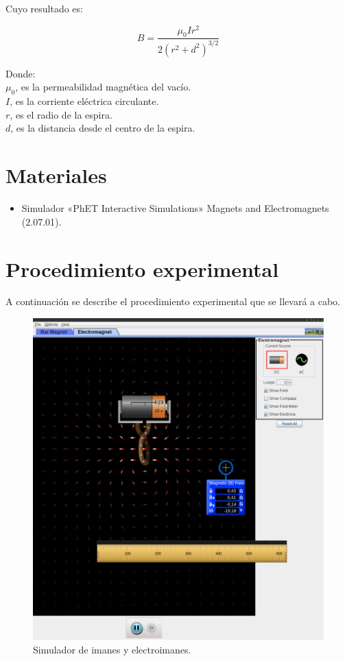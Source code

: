 \documentclass[letter,11pt]{article}
\begin{document}
Cuyo resultado es:

\begin{equation}
    B = \frac{\mu_0 I r^2}{2 (r^2+d^2)^{3/2}}
\label{espira}
\end{equation}

Donde: \\
$\mu_0$, es la permeabilidad magnética del vacío. \\
$I$, es la corriente eléctrica circulante. \\
$r$, es el radio de la espira. \\
$d$, es la distancia desde el centro de la espira. \\

\section{Materiales}
\begin{itemize}
\item Simulador «PhET Interactive Simulations» Magnets and Electromagnets
(2.07.01).
\end{itemize}

\section{Procedimiento experimental}

A continuación se describe el procedimiento experimental que se llevará a cabo.

\begin{figure}[!h]
\centering
\includegraphics[scale=0.56]{resources/f3.eps}
\caption{Simulador de imanes y electroimanes.}
\label{figura3}
\end{figure}
\end{document}
